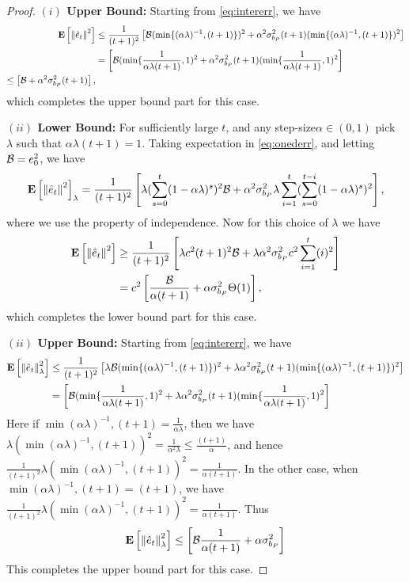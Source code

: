 \begin{proof}
\textbf{$(i)$ Upper Bound:}
Starting from \eqref{eq:intererr}, we have
\begin{align}
\mathbf{E}\left[\left\| \hat{e}_t\right\|^2\right]&\leq \frac{1}{(t+1)^2}\left[\mathcal{B} (\min\{(\alpha\lambda)^{-1},(t+1)\})^2+ \alpha^2 \sigma^2_{b_P} (t+1) (\min\{(\alpha\lambda)^{-1},(t+1)\})^2 \right]\\
&= \left[\mathcal{B} (\min\{\frac{1}{\alpha \lambda (t+1)},1)^2+ \alpha^2 \sigma^2_{b_P} (t+1) (\min\{\frac{1}{\alpha \lambda (t+1)},1)^2 \right]\\
\leq \left[\mathcal{B} + \alpha^2 \sigma^2_{b_P} (t+1) \right], 
\end{align}
which completes the upper bound part for this case.

\textbf{$(ii)$ Lower Bound:}
For sufficiently large $t$, and any step-size$\alpha \in (0,1)$ pick $\lambda$ such that $\alpha \lambda (t+1)=1$. Taking expectation in \eqref{eq:onederr}, and letting $\mathcal{B}=e_0^2$, we have
\begin{align}\label{eq:intererr}
\mathbf{E}\left[\left\| \hat{e}_t\right\|^2\right]_{\lambda}=\frac{1}{(t+1)^2}\left[ \lambda (\sum_{s=0}^t(1-\alpha \lambda)^s)^2 \mathcal{B}+ \alpha^2\sigma^2_{b_P}\lambda \sum_{i=1}^t (\sum_{s=0}^{t-i} (1-\alpha \lambda)^s)^2\right],
\end{align}
where we use the property of independence. Now for this choice of $\lambda$ we have
\begin{align}
\mathbf{E}\left[\left\| \hat{e}_t\right\|^2\right]&\geq \frac{1}{(t+1)^2}\left[ \lambda c^2(t+1)^2 \mathcal{B}+ \lambda \alpha^2\sigma^2_{b_P} c^2\sum_{i=1}^t (i)^2\right]\\
&= c^2\left[\frac{\mathcal{B}}{\alpha (t+1)}+ \alpha  \sigma^2_{b_P} \Theta(1) \right],
\end{align}
which completes the lower bound part for this case.

\textbf{$(ii)$ Upper Bound:}
Starting from \eqref{eq:intererr}, we have
\begin{align}
\mathbf{E}\left[\left\| \hat{e}_t\right\|^2_{\lambda}\right]&\leq \frac{1}{(t+1)^2}\left[\lambda \mathcal{B} (\min\{(\alpha\lambda)^{-1},(t+1)\})^2+ \lambda \alpha^2 \sigma^2_{b_P} (t+1) (\min\{(\alpha\lambda)^{-1},(t+1)\})^2 \right]\\
&= \left[\mathcal{B} (\min\{\frac{1}{\alpha \lambda (t+1)},1)^2+ \lambda \alpha^2 \sigma^2_{b_P} (t+1) (\min\{\frac{1}{\alpha \lambda (t+1)},1)^2 \right]\\
\end{align}
Here if $\min{(\alpha\lambda)^{-1},(t+1)}=\frac{1}{\alpha \lambda}$, then we have $\lambda(\min{(\alpha\lambda)^{-1},(t+1)})^2=\frac{1}{\alpha^2 \lambda}\leq \frac{(t+1)}{\alpha}$, and hence $\frac{1}{(t+1)^2}\lambda(\min{(\alpha\lambda)^{-1},(t+1)})^2=\frac{1}{\alpha (t+1)}$. In the other case, when $\min{(\alpha\lambda)^{-1},(t+1)}=(t+1)$, we have
$\frac{1}{(t+1)^2}\lambda(\min{(\alpha\lambda)^{-1},(t+1)})^2=\frac{1}{\alpha (t+1)}$. Thus
\begin{align}
\mathbf{E}\left[\left\| \hat{e}_t\right\|^2_{\lambda}\right]&\leq \left[\mathcal{B} \frac{1}{\alpha (t+1)}+ \alpha \sigma^2_{b_P} \right]\\
\end{align}
This completes the upper bound part for this case.


\end{proof}
